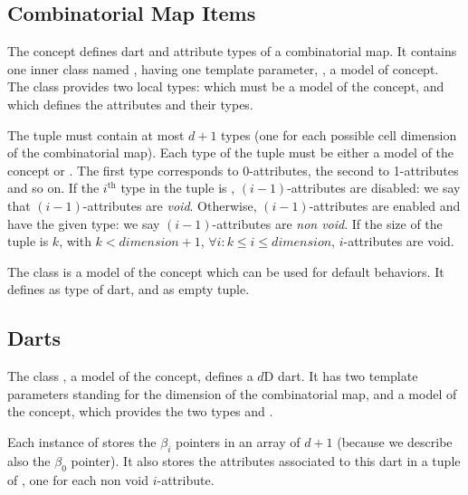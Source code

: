\subsection{Combinatorial Map Items}\label{ssec-item}

The  concept defines dart and attribute
types of a combinatorial map. It contains one inner class named
, having one template parameter, , a model
of  concept.  The  class
provides two local types:  which must be a model of the
 concept, and  which defines the attributes
and their types.

The  tuple must contain at most $d+1$ types (one for
each possible cell dimension of the combinatorial map).  Each type of
the tuple must be either a model of the  concept or
.  The first type corresponds to 0-attributes, the second to
1-attributes and so on. If the $i^{\mbox{th}}$ type in the tuple is
, $(i-1)$-attributes are disabled: we say that
$(i-1)$-attributes are \emph{void}.  Otherwise, $(i-1)$-attributes are
enabled and have the given type: we say $(i-1)$-attributes are
\emph{non void}.  If the size of the tuple is $k$, with $k <
dimension+1$, $\forall i: k \leq i \leq dimension$, $i$-attributes are
void.

The class  is a model of the
 concept which can be used for default behaviors.
It defines  as type of dart, and
 as empty tuple.

\subsection{Darts}\label{ssec-darts}

The class , a model of the  concept,
defines a $d$D dart. It has two template parameters standing for the
dimension of the combinatorial map, and a model of the
 concept, which provides the two types
 and . 

Each instance  of  stores the $\beta_i$ pointers in an
array of $d+1$  (because we describe also the
$\beta_0$ pointer).  It also stores the attributes associated to this
dart in a tuple of , one for each
non void $i$-attribute.


